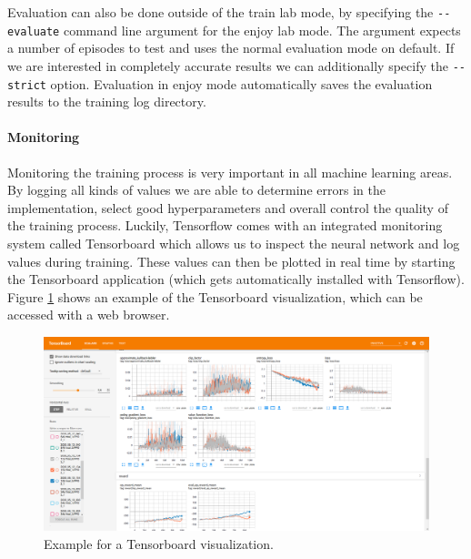Evaluation can also be done outside of the train lab mode, by specifying the \texttt{-{}-evaluate} command line argument for the enjoy lab mode. The argument expects a number of episodes to test and uses the normal evaluation mode on default. If we are interested in completely accurate results we can additionally specify the \texttt{-{}-strict} option. Evaluation in enjoy mode automatically saves the evaluation results to the training log directory. 

\paragraph{Monitoring}
Monitoring the training process is very important in all machine learning areas. By logging all kinds of values we are able to determine errors in the implementation, select good hyperparameters and overall control the quality of the training process. Luckily, Tensorflow comes with an integrated monitoring system called Tensorboard which allows us to inspect the neural network and log values during training. These values can then be plotted in real time by starting the Tensorboard application (which gets automatically installed with Tensorflow). Figure \ref{fig:TensorboardExample} shows an example of the Tensorboard visualization, which can be accessed with a web browser.

\begin{figure}[ht]
    
    \begin{center}
        \includegraphics[clip, width=0.95\columnwidth]{figures/implementation/Tensorboard.png}
    \end{center}
    
    \caption[Tensorboard Example]{Example for a Tensorboard visualization.}
    \label{fig:TensorboardExample}
  \end{figure}

